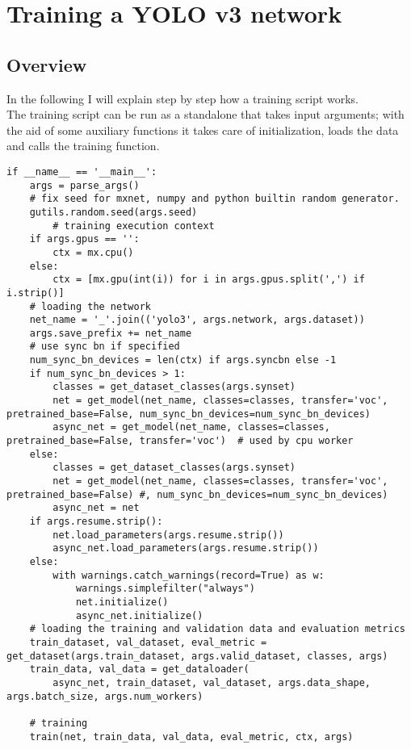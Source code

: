 
\chapter{Training a YOLO v3 network}
\label{cap:training-a-yolo-network}
\section{Overview}
In the following I will explain step by step how a training script works.\\
The training script can be run as a standalone that takes input arguments; with the aid of some auxiliary functions it takes care of initialization, loads the data and calls the training function.
\begin{lstlisting}
if __name__ == '__main__':
    args = parse_args()
    # fix seed for mxnet, numpy and python builtin random generator.
    gutils.random.seed(args.seed)
		# training execution context
    if args.gpus == '':
        ctx = mx.cpu()
    else:
        ctx = [mx.gpu(int(i)) for i in args.gpus.split(',') if i.strip()]
    # loading the network
    net_name = '_'.join(('yolo3', args.network, args.dataset))
    args.save_prefix += net_name
    # use sync bn if specified
    num_sync_bn_devices = len(ctx) if args.syncbn else -1
    if num_sync_bn_devices > 1:
        classes = get_dataset_classes(args.synset)
        net = get_model(net_name, classes=classes, transfer='voc', pretrained_base=False, num_sync_bn_devices=num_sync_bn_devices)
        async_net = get_model(net_name, classes=classes, pretrained_base=False, transfer='voc')  # used by cpu worker
    else:
        classes = get_dataset_classes(args.synset)
        net = get_model(net_name, classes=classes, transfer='voc', pretrained_base=False) #, num_sync_bn_devices=num_sync_bn_devices)
        async_net = net
    if args.resume.strip():
        net.load_parameters(args.resume.strip())
        async_net.load_parameters(args.resume.strip())
    else:
        with warnings.catch_warnings(record=True) as w:
            warnings.simplefilter("always")
            net.initialize()
            async_net.initialize()
    # loading the training and validation data and evaluation metrics
    train_dataset, val_dataset, eval_metric = get_dataset(args.train_dataset, args.valid_dataset, classes, args)
    train_data, val_data = get_dataloader(
        async_net, train_dataset, val_dataset, args.data_shape, args.batch_size, args.num_workers)

    # training
    train(net, train_data, val_data, eval_metric, ctx, args)
\end{lstlisting}


